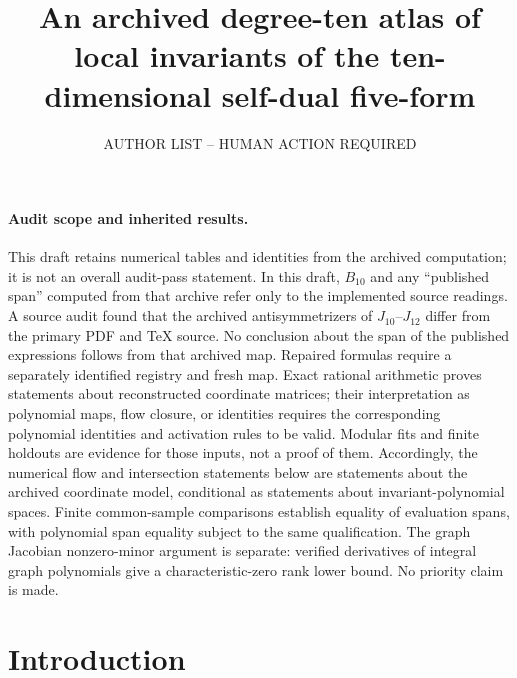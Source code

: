 \documentclass[11pt,a4paper]{article}
\title{An archived degree-ten atlas of local invariants of the
       ten-dimensional self-dual five-form}
\author[a]{AUTHOR LIST -- HUMAN ACTION REQUIRED}
\affiliation[a]{AFFILIATIONS -- HUMAN ACTION REQUIRED}
\begin{document}
\maketitle

\paragraph{Audit scope and inherited results.}
This draft retains numerical tables and identities from the archived computation;
it is not an overall audit-pass statement. In this draft, $B_{10}$ and any
``published span'' computed from that archive refer only to the implemented
source readings. A source audit found that the archived antisymmetrizers of
$J_{10}$--$J_{12}$ differ from the primary PDF and TeX source. No conclusion
about the span of the published expressions follows from that archived map.
Repaired formulas require a separately identified registry and fresh map.
Exact rational arithmetic proves statements about reconstructed coordinate
matrices; their interpretation as polynomial maps, flow closure, or identities
requires the corresponding polynomial identities and activation rules to be
valid. Modular fits and finite holdouts are evidence for those inputs, not a
proof of them. Accordingly, the numerical flow and intersection statements
below are statements about the archived coordinate model, conditional as
statements about invariant-polynomial spaces. Finite common-sample comparisons
establish equality of evaluation spans, with polynomial span equality subject
to the same qualification. The graph Jacobian nonzero-minor argument is
separate: verified derivatives of integral graph polynomials give a
characteristic-zero rank lower bound. No priority claim is made.


\begin{center}
\end{center}

\section{Introduction}
\label{sec:intro}
\end{document}
